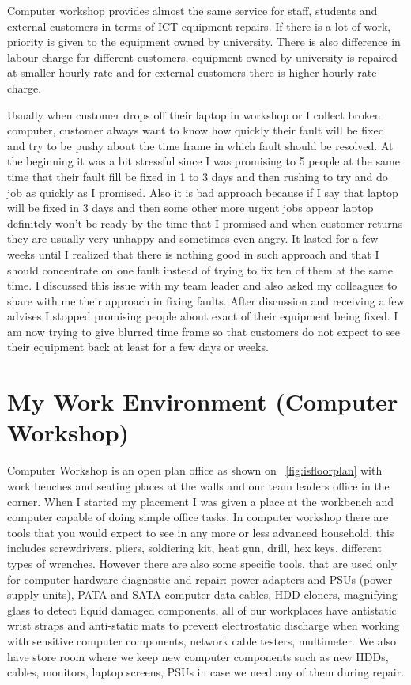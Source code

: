 \documentclass[10pt,a4paper,headinclude=true]{report}
\begin{document}
Computer workshop provides almost the same service for staff, students and external customers in terms of ICT equipment repairs. If there is a lot of work, priority is given to the equipment owned by university. There is also difference in labour charge for different customers, equipment owned by university is repaired at smaller hourly rate and for external customers there is higher hourly rate charge.

Usually when customer drops off their laptop in workshop or I collect broken computer, customer always want to know how quickly their fault will be fixed and try to be pushy about the time frame in which fault should be resolved. At the beginning it was a bit stressful since I was promising to 5 people at the same time that their fault fill be fixed in 1 to 3 days and then rushing to try and do job as quickly as I promised. Also it is bad approach because if I say that laptop will be fixed in 3 days and then some other more urgent jobs appear laptop definitely won't be ready by the time that I promised and when customer returns they are usually very unhappy and sometimes even angry. It lasted for a few weeks until I realized that there is nothing good in such approach and that I should concentrate on one fault instead of trying to fix ten of them at the same time. I discussed this issue with my team leader and also asked my colleagues to share with me their approach in fixing faults. After discussion and receiving a few advises I stopped promising people about exact of their equipment being fixed. I am now trying to give blurred time frame so that customers do not expect to see their equipment back at least for a few days or weeks.  
\section{My Work Environment (Computer Workshop)}
Computer Workshop is an open plan office as shown on ~\ref{fig:isfloorplan} with work benches and seating places at the walls and our team leaders office in the corner. When I started my placement I was given a place at the workbench and computer capable of doing simple office tasks. In computer workshop there are tools that you would expect to see in any more or less advanced household, this includes screwdrivers, pliers, soldiering kit, heat gun, drill, hex keys, different types of wrenches. However there are also some specific tools, that are used only for computer hardware diagnostic and repair: power adapters and PSUs (power supply units), PATA and SATA computer data cables, HDD cloners, magnifying glass to detect liquid damaged components, all of our workplaces have antistatic wrist straps and anti-static mats to prevent electrostatic discharge when working with sensitive computer components, network cable testers, multimeter. We also have store room where we keep new computer components such as new HDDs, cables, monitors, laptop screens, PSUs in case we need any of them during repair.    
\end{document}
